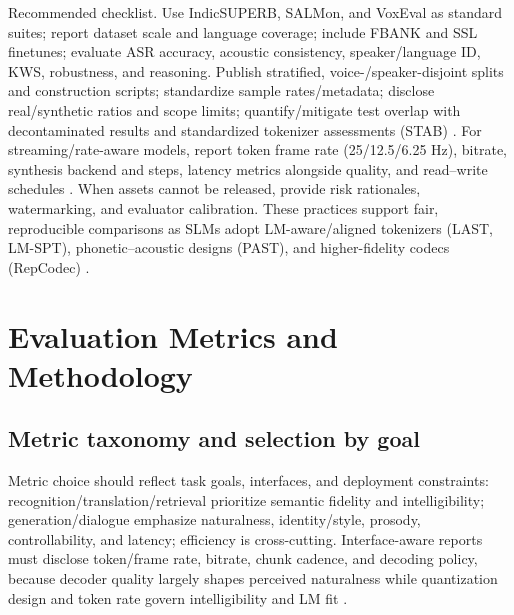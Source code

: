 \documentclass{article}
\begin{document}
Recommended checklist. Use IndicSUPERB, SALMon, and VoxEval as standard suites; report dataset scale and language coverage; include FBANK and SSL finetunes; evaluate ASR accuracy, acoustic consistency, speaker/language ID, KWS, robustness, and reasoning. Publish stratified, voice-/speaker-disjoint splits and construction scripts; standardize sample rates/metadata; disclose real/synthetic ratios and scope limits; quantify/mitigate test overlap with decontaminated results and standardized tokenizer assessments (STAB) \cite{vashishth2024stabspeechtokenizerassessmentbenchmark}. For streaming/rate-aware models, report token frame rate (25/12.5/6.25 Hz), bitrate, synthesis backend and steps, latency metrics alongside quality, and read--write schedules \cite{zhang2025impactframeratesspeechtokenizercasestudy}. When assets cannot be released, provide risk rationales, watermarking, and evaluator calibration. These practices support fair, reproducible comparisons as SLMs adopt LM-aware/aligned tokenizers (LAST, LM-SPT), phonetic--acoustic designs (PAST), and higher-fidelity codecs (RepCodec) \cite{turetzky2024lastlanguagemodelawarespeechtokenization,jo2025lmsptalignedsemanticdistillationspeechto,har-tuv2025pastphoneticacousticspeechtokenizer,huang2024repcodecspeechrepresentationcodectokeniz}.

















\section{Evaluation Metrics and Methodology} \label{sec:evaluationmetricsandmethodology}

\subsection{Metric taxonomy and selection by goal} \label{subsec:metrictaxonomyandselectionbygoal}
Metric choice should reflect task goals, interfaces, and deployment constraints: recognition/translation/retrieval prioritize semantic fidelity and intelligibility; generation/dialogue emphasize naturalness, identity/style, prosody, controllability, and latency; efficiency is cross-cutting. Interface-aware reports must disclose token/frame rate, bitrate, chunk cadence, and decoding policy, because decoder quality largely shapes perceived naturalness while quantization design and token rate govern intelligibility and LM fit \cite{turetzky2024lastlanguagemodelawarespeechtokenization,zhang2025impactframeratesspeechtokenizercasestudy,li2024investigatingneuralaudiocodecsspeechlang}.
\end{document}
